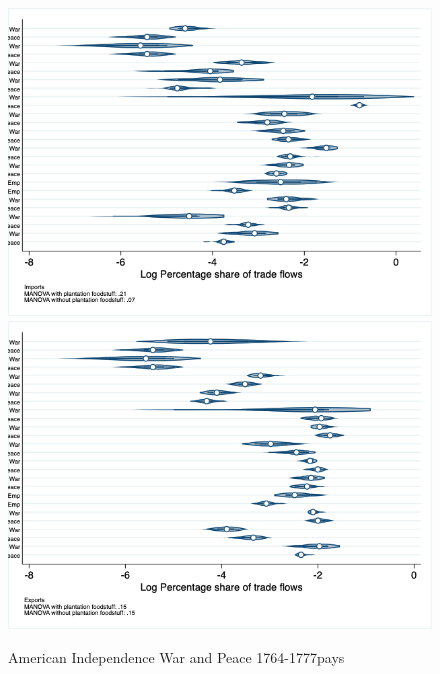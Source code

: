 \documentclass[12pt,a4paper,notitlepage,english]{article}
\begin{document}
\begin{figure}
\centering
\caption{American Independence War and Peace 1764-1777pays}
\label{peace1764_1777_indep_nat_distr}
\includegraphics[scale=.4]{peace1764_1777_indep_nat_distr_Ipays}
\includegraphics[scale=.4]{peace1764_1777_indep_nat_distr_Xpays}
\end{figure}
\end{document}
